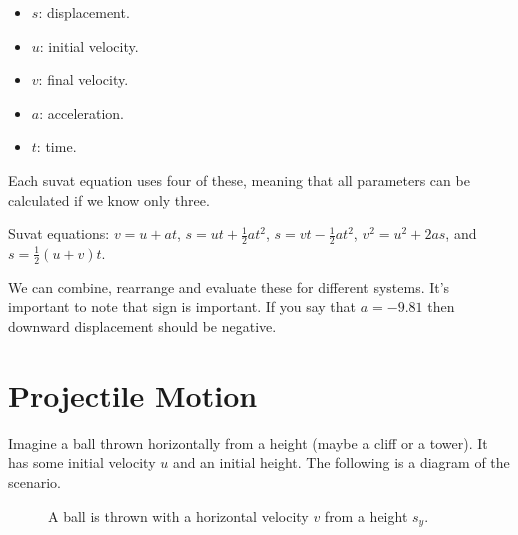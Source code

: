 \documentclass[11pt]{article}
\begin{document}
\begin{itemize}
	\item $s$: displacement.
	\item $u$: initial velocity.
	\item $v$: final velocity.
	\item $a$: acceleration.
	\item $t$: time.
\end{itemize}

Each suvat equation uses four of these, meaning that all parameters can be calculated if we know only three.

\begin{definition}
	Suvat equations: $v=u+at$, $s=ut+\frac{1}{2}at^{2}$, $s=vt-\frac{1}{2}at^{2}$, $v^{2}=u^{2}+2as$, and $s=\frac{1}{2}(u+v)t$.
\end{definition}
We can combine, rearrange and evaluate these for different systems. It's important to note that sign is important. If you say that $a=-9.81$ then downward displacement should be negative.

\section{Projectile Motion}

Imagine a ball thrown horizontally from a height (maybe a cliff or a tower). It has some initial velocity $u$ and an initial height. The following is a diagram of the scenario.

\begin{figure}[ht]
\centering
	\caption{A ball is thrown with a horizontal velocity $v$ from a height $s_{y}$.}
\end{figure}
\end{document}
